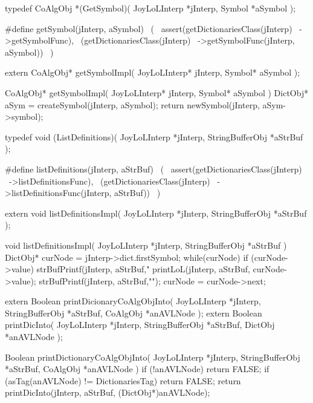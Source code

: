 \startCHeader
typedef CoAlgObj *(GetSymbol)(
  JoyLoLInterp *jInterp,
  Symbol       *aSymbol
);

#define getSymbol(jInterp, aSymbol)       \
  (                                       \
    assert(getDictionariesClass(jInterp)  \
      ->getSymbolFunc),                   \
    (getDictionariesClass(jInterp)        \
      ->getSymbolFunc(jInterp, aSymbol))  \
  )
\stopCHeader

\setCHeaderStream{private}
\startCHeader
extern CoAlgObj* getSymbolImpl(
  JoyLoLInterp* jInterp,
  Symbol* aSymbol
);
\stopCHeader
{}

\startCCode
CoAlgObj* getSymbolImpl(
  JoyLoLInterp* jInterp,
  Symbol* aSymbol
) {
  DictObj* aSym = createSymbol(jInterp, aSymbol);
  return newSymbol(jInterp, aSym->symbol);
}
\stopCCode

\startCHeader
typedef void (ListDefinitions)(
  JoyLoLInterp    *jInterp,
  StringBufferObj *aStrBuf
);

#define listDefinitions(jInterp, aStrBuf)       \
  (                                             \
    assert(getDictionariesClass(jInterp)        \
      ->listDefinitionsFunc),                   \
    (getDictionariesClass(jInterp)              \
      ->listDefinitionsFunc(jInterp, aStrBuf))  \
  )
\stopCHeader

\setCHeaderStream{private}
\startCHeader
extern void listDefinitionsImpl(
  JoyLoLInterp    *jInterp,
  StringBufferObj *aStrBuf
);
\stopCHeader
\setCHeaderStream{public}

\startCCode
void listDefinitionsImpl(
  JoyLoLInterp    *jInterp,
  StringBufferObj *aStrBuf
) {
  DictObj* curNode = jInterp->dict.firstSymbol;
  while(curNode) {
    if (curNode->value) {
      strBufPrintf(jInterp, aStrBuf,"%
      printLoL(jInterp, aStrBuf, curNode->value);
      strBufPrintf(jInterp, aStrBuf,"\n");
    }
    curNode = curNode->next;
  }
}
\stopCCode

\setCHeaderStream{private}
\startCHeader
extern Boolean printDicionaryCoAlgObjInto(
  JoyLoLInterp    *jInterp,
  StringBufferObj *aStrBuf,
  CoAlgObj        *anAVLNode
);
extern Boolean printDicInto(
  JoyLoLInterp    *jInterp,
  StringBufferObj *aStrBuf,
  DictObj         *anAVLNode
);
\stopCHeader
{}

\startCCode
Boolean printDictionaryCoAlgObjInto(
  JoyLoLInterp    *jInterp,
  StringBufferObj *aStrBuf,
  CoAlgObj        *anAVLNode
) {
  if (!anAVLNode) return FALSE;
  if (asTag(anAVLNode) != DictionariesTag) return FALSE;
  return printDicInto(jInterp, aStrBuf, (DictObj*)anAVLNode);
}


